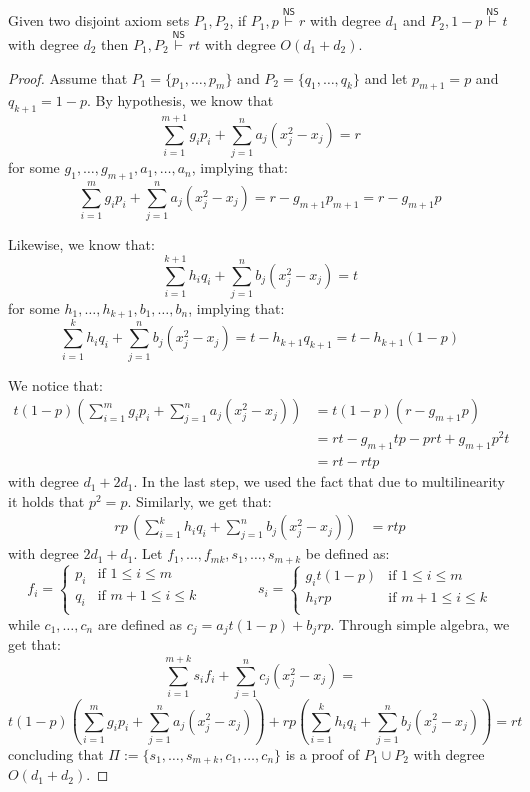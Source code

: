 \begin{lemma}
    \label{union_ref}
 Given two disjoint axiom sets $P_1, P_2$, if $P_1, p \stackrel{\mathsf{NS}}{\vdash} r$ with degree $d_1$ and $P_2, 1-p \stackrel{\mathsf{NS}}{\vdash} t$ with degree $d_2$ then $P_1, P_2 \stackrel{\mathsf{NS}}{\vdash} rt$ with degree $O(d_1 + d_2)$.
\end{lemma}

\begin{proof}
 Assume that $P_1 = \{p_1, \ldots, p_m\}$ and $P_2 = \{q_1, \ldots, q_k\}$ and let $p_{m+1} = p$ and $q_{k+1} = 1-p$. By hypothesis, we know that
    \[\sum_{i = 1}^{m+1} g_i p_i + \sum_{j = 1}^n a_j (x_j^2-x_j) = r\]
 for some $g_1, \ldots, g_{m+1}, a_1, \ldots, a_n$, implying that:
    \[\sum_{i = 1}^{m} g_i p_i + \sum_{j = 1}^n a_j (x_j^2-x_j) = r - g_{m+1} p_{m+1} = r-g_{m+1} p\]
    
\noindent
 Likewise, we know that:
    \[\sum_{i = 1}^{k+1} h_i q_i + \sum_{j = 1}^n b_j (x_j^2-x_j) = t\]
 for some $h_1, \ldots, h_{k+1}, b_1, \ldots, b_n$, implying that:
    \[\sum_{i = 1}^{k} h_iq_i + \sum_{j = 1}^n b_j (x_j^2-x_j) = t-h_{k+1}q_{k+1} = t-h_{k+1}(1-p)\]

\noindent
 We notice that:
    \[\begin{split}
 t(1-p) \left (\sum_{i = 1}^{m} g_i p_i + \sum_{j = 1}^n a_j (x_j^2-x_j) \right ) &= t(1-p)(r-g_{m+1} p) \\
        &= rt-g_{m+1} tp - prt + g_{m+1} p^2t \\
        &= rt-rtp
    \end{split}\]
 with degree $d_1+2d_1$. In the last step, we used the fact that due to multilinearity it holds that $p^2 = p$. Similarly, we get that:
    \[\begin{split}
 rp\, \left (\sum_{i = 1}^{k} h_iq_i + \sum_{j = 1}^n b_j (x_j^2-x_j)  \right ) &= rtp 
    \end{split}\]
 with degree $2d_1+d_1$. Let $f_1, \ldots, f_{mk}, s_1, \ldots, s_{m+k}$ be defined as:
    \[f_i = \left \{ \begin{array}{ll}
 p_i & \text{if } 1 \leq i \leq m \\
 q_i & \text{if } m+1 \leq i \leq k \\
    \end{array} \right .
 \qquad\qquad
 s_i = \left \{ \begin{array}{ll}
 g_i t(1-p) & \text{if } 1 \leq i \leq m \\
 h_irp & \text{if } m+1 \leq i \leq k \\
    \end{array} \right .\]
 while $c_1, \ldots, c_n$ are defined as $c_j = a_jt(1-p) + b_jrp$. Through simple algebra, we get that:
    \[\sum_{i = 1}^{m+k} s_i f_i + \sum_{j = 1}^n c_j (x_j^2-x_j) =\]
    \[t(1-p) \left (\sum_{i = 1}^{m} g_i p_i + \sum_{j = 1}^n a_j (x_j^2-x_j) \right ) + rp \left (\sum_{i = 1}^{k} h_iq_i + \sum_{j = 1}^n b_j (x_j^2-x_j) \right )= rt\]
 concluding that $\Pi := \{s_1, \ldots, s_{m+k}, c_1, \ldots, c_n\}$ is a proof of $P_1 \cup P_2$ with degree $O(d_1 + d_2)$.

\end{proof}

